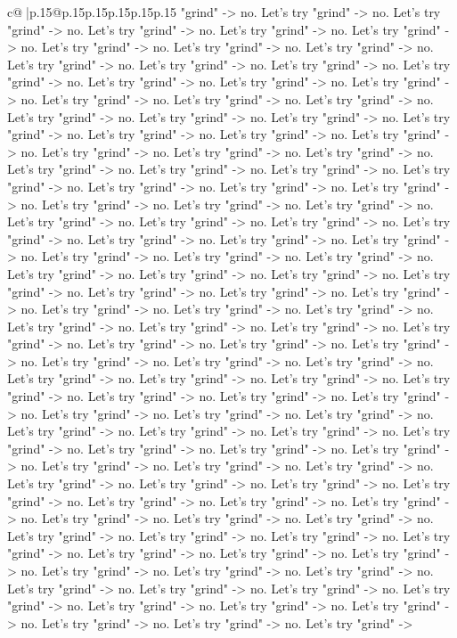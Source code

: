 \documentclass{article}
\begin{document}
{\begin{supertabular}{c@{$\;$}|p{.15\linewidth}@{}p{.15\linewidth}p{.15\linewidth}p{.15\linewidth}p{.15\linewidth}p{.15\linewidth}}
{{{"grind" {-}> no. Let's try "grind" {-}> no. Let's try "grind" {-}> no. Let's try "grind" {-}> no. Let's try "grind" {-}> no. Let's try "grind" {-}> no. Let's try "grind" {-}> no. Let's try "grind" {-}> no. Let's try "grind" {-}> no. Let's try "grind" {-}> no. Let's try "grind" {-}> no. Let's try "grind" {-}> no. Let's try "grind" {-}> no. Let's try "grind" {-}> no. Let's try "grind" {-}> no. Let's try "grind" {-}> no. Let's try "grind" {-}> no. Let's try "grind" {-}> no. Let's try "grind" {-}> no. Let's try "grind" {-}> no. Let's try "grind" {-}> no. Let's try "grind" {-}> no. Let's try "grind" {-}> no. Let's try "grind" {-}> no. Let's try "grind" {-}> no. Let's try "grind" {-}> no. Let's try "grind" {-}> no. Let's try "grind" {-}> no. Let's try "grind" {-}> no. Let's try "grind" {-}> no. Let's try "grind" {-}> no. Let's try "grind" {-}> no. Let's try "grind" {-}> no. Let's try "grind" {-}> no. Let's try "grind" {-}> no. Let's try "grind" {-}> no. Let's try "grind" {-}> no. Let's try "grind" {-}> no. Let's try "grind" {-}> no. Let's try "grind" {-}> no. Let's try "grind" {-}> no. Let's try "grind" {-}> no. Let's try "grind" {-}> no. Let's try "grind" {-}> no. Let's try "grind" {-}> no. Let's try "grind" {-}> no. Let's try "grind" {-}> no. Let's try "grind" {-}> no. Let's try "grind" {-}> no. Let's try "grind" {-}> no. Let's try "grind" {-}> no. Let's try "grind" {-}> no. Let's try "grind" {-}> no. Let's try "grind" {-}> no. Let's try "grind" {-}> no. Let's try "grind" {-}> no. Let's try "grind" {-}> no. Let's try "grind" {-}> no. Let's try "grind" {-}> no. Let's try "grind" {-}> no. Let's try "grind" {-}> no. Let's try "grind" {-}> no. Let's try "grind" {-}> no. Let's try "grind" {-}> no. Let's try "grind" {-}> no. Let's try "grind" {-}> no. Let's try "grind" {-}> no. Let's try "grind" {-}> no. Let's try "grind" {-}> no. Let's try "grind" {-}> no. Let's try "grind" {-}> no. Let's try "grind" {-}> no. Let's try "grind" {-}> no. Let's try "grind" {-}> no. Let's try "grind" {-}> no. Let's try "grind" {-}> no. Let's try "grind" {-}> no. Let's try "grind" {-}> no. Let's try "grind" {-}> no. Let's try "grind" {-}> no. Let's try "grind" {-}> no. Let's try "grind" {-}> no. Let's try "grind" {-}> no. Let's try "grind" {-}> no. Let's try "grind" {-}> no. Let's try "grind" {-}> no. Let's try "grind" {-}> no. Let's try "grind" {-}> no. Let's try "grind" {-}> no. Let's try "grind" {-}> no. Let's try "grind" {-}> no. Let's try "grind" {-}> no. Let's try "grind" {-}> no. Let's try "grind" {-}> no. Let's try "grind" {-}> no. Let's try "grind" {-}> no. Let's try "grind" {-}> no. Let's try "grind" {-}> no. Let's try "grind" {-}> no. Let's try "grind" {-}> no. Let's try "grind" {-}> no. Let's try "grind" {-}> no. Let's try "grind" {-}> no. Let's try "grind" {-}> no. Let's try "grind" {-}> no. Let's try "grind" {-}> no. Let's try "grind" {-}> no. Let's try "grind" {-}> no. Let's try "grind" {-}> no. Let's try "grind" {-}> no. Let's try "grind" {-}> no. Let's try "grind" {-}> no. Let's try "grind" {-}> no. Let's try "grind" {-}> no. Let's try "grind" {-}> no. Let's try "grind" {-}> no. Let's try "grind" {-}> no. Let's try "grind" {-}> no. Let's try "grind" {-}> }}}
\end{supertabular}}
\end{document}
